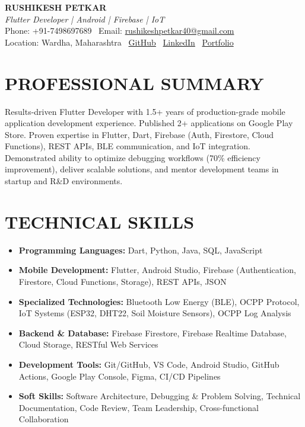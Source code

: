 \documentclass[a4paper,11pt]{article}
\begin{document}
\begin{center}
    {\Large \textbf{RUSHIKESH PETKAR}}\\[3pt]
    \textit{Flutter Developer | Android | Firebase | IoT}\\[2pt]
    Phone: +91-7498697689 \textbar\ Email: \href{mailto:rushikeshpetkar40@gmail.com}{rushikeshpetkar40@gmail.com}\\
    Location: Wardha, Maharashtra \textbar\ \href{https://github.com/petkarrushikesh}{GitHub} \textbar\ \href{https://linkedin.com/in/rushikesh-petkar-a043bb239}{LinkedIn} \textbar\ \href{https://petkarrushikesh.github.io/rushikesh_portfolio/}{Portfolio}
\end{center}
\vspace{-3mm}

\section{PROFESSIONAL SUMMARY}
Results-driven Flutter Developer with 1.5+ years of production-grade mobile application development experience. Published 2+ applications on Google Play Store. Proven expertise in Flutter, Dart, Firebase (Auth, Firestore, Cloud Functions), REST APIs, BLE communication, and IoT integration. Demonstrated ability to optimize debugging workflows (70\% efficiency improvement), deliver scalable solutions, and mentor development teams in startup and R\&D environments.
\vspace{-2mm}

\section{TECHNICAL SKILLS}
\begin{itemize}[leftmargin=*,noitemsep,topsep=0pt,itemsep=2pt]
    \item \textbf{Programming Languages:} Dart, Python, Java, SQL, JavaScript
    \item \textbf{Mobile Development:} Flutter, Android Studio, Firebase (Authentication, Firestore, Cloud Functions, Storage), REST APIs, JSON
    \item \textbf{Specialized Technologies:} Bluetooth Low Energy (BLE), OCPP Protocol, IoT Systems (ESP32, DHT22, Soil Moisture Sensors), OCPP Log Analysis
    \item \textbf{Backend \& Database:} Firebase Firestore, Firebase Realtime Database, Cloud Storage, RESTful Web Services
    \item \textbf{Development Tools:} Git/GitHub, VS Code, Android Studio, GitHub Actions, Google Play Console, Figma, CI/CD Pipelines
    \item \textbf{Soft Skills:} Software Architecture, Debugging \& Problem Solving, Technical Documentation, Code Review, Team Leadership, Cross-functional Collaboration
\end{itemize}
\vspace{-1mm}
\end{document}
